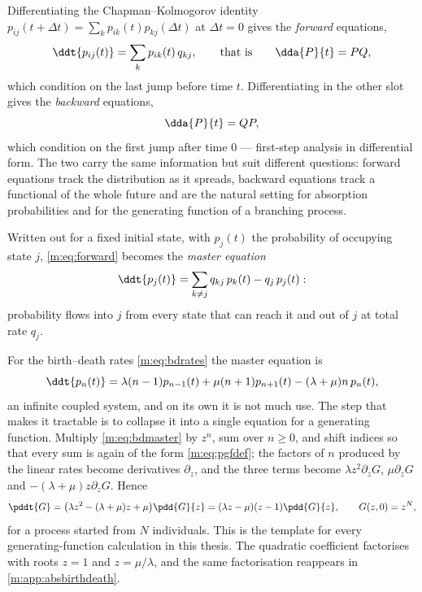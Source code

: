 Differentiating the Chapman--Kolmogorov identity
$p_{ij}(t+\Delta t)=\sum_kp_{ik}(t)p_{kj}(\Delta t)$ at $\Delta t=0$ gives the
\emph{forward} equations,
\begin{equation}
\label{m:eq:forward}
\ddt{p_{ij}(t)} = \sum_kp_{ik}(t)\,q_{kj},
\qquad\text{that is}\qquad
\dda{P}{t} = PQ ,
\end{equation}
which condition on the last jump before time $t$. Differentiating in the other slot
gives the \emph{backward} equations,
\begin{equation}
\label{m:eq:backwardeq}
\dda{P}{t} = QP ,
\end{equation}
which condition on the first jump after time $0$ --- first-step analysis in
differential form. The two carry the same information but suit different questions:
forward equations track the distribution as it spreads, backward equations track a
functional of the whole future and are the natural setting for absorption
probabilities and for the generating function of a branching process.

Written out for a fixed initial state, with $p_j(t)$ the probability of occupying
state $j$, \cref{m:eq:forward} becomes the \emph{master equation}
\begin{equation}
\label{m:eq:master}
\ddt{p_j(t)} = \sum_{k\neq j}q_{kj}\,p_k(t) - q_j\,p_j(t) :
\end{equation}
probability flows into $j$ from every state that can reach it and out of $j$ at
total rate $q_j$.

For the birth--death rates \cref{m:eq:bdrates} the master equation is
\begin{equation}
\label{m:eq:bdmaster}
\ddt{p_n(t)} = \lambda(n-1)p_{n-1}(t) + \mu(n+1)p_{n+1}(t) - (\lambda+\mu)n\,p_n(t),
\end{equation}
an infinite coupled system, and on its own it is not much use. The step that makes
it tractable is to collapse it into a single equation for a generating function.
Multiply \cref{m:eq:bdmaster} by $z^n$, sum over $n\ge0$, and shift indices so that
every sum is again of the form \cref{m:eq:pgfdef}; the factors of $n$ produced by
the linear rates become derivatives $\partial_z$, and the three terms become
$\lambda z^2\partial_zG$, $\mu\partial_zG$ and $-(\lambda+\mu)z\partial_zG$. Hence
\begin{equation}
\label{m:eq:bdpde}
\pddt{G} = \bigl(\lambda z^2-(\lambda+\mu)z+\mu\bigr)\pdd{G}{z}
= (\lambda z-\mu)(z-1)\pdd{G}{z},
\qquad
G(z,0)=z^N ,
\end{equation}
for a process started from $N$ individuals. This is the template for every
generating-function calculation in this thesis. The quadratic coefficient
factorises with roots $z=1$ and $z=\mu/\lambda$, and the same factorisation
reappears in \cref{m:app:absbirthdeath}.

